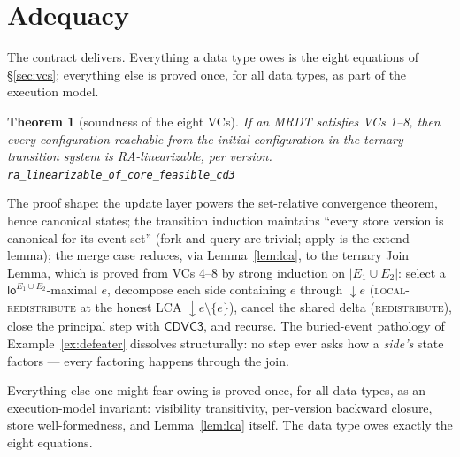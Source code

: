 \documentclass[11pt]{article}
\newtheorem{theorem}{Theorem}[section]
\newcommand{\loE}[1]{\mathsf{lo}^{#1}}
\newcommand{\dow}[1]{{\downarrow}#1}
\newcommand{\cd}{\mathsf{CDVC3}}
\newcommand{\lean}[1]{\texttt{#1}}
\begin{document}
\section{Adequacy}
\label{sec:adequacy}

The contract delivers. Everything a data type owes is the eight
equations of \S\ref{sec:vcs}; everything else is proved once, for all
data types, as part of the execution model.

\begin{theorem}[soundness of the eight VCs]
\label{thm:main}
If an MRDT satisfies VCs 1--8, then every configuration reachable from
the initial configuration in the ternary transition system is
RA-linearizable, per version.
\hfill\lean{ra\_linearizable\_of\_core\_feasible\_cd3}
\end{theorem}

The proof shape: the update layer powers the set-relative convergence
theorem, hence canonical states; the transition induction maintains
``every store version is canonical for its event set'' (fork and query
are trivial; apply is the extend lemma); the merge case reduces, via
Lemma~\ref{lem:lca}, to the ternary Join Lemma, which is proved from VCs
4--8 by strong induction on $|E_1 \cup E_2|$: select a
$\loE{E_1\cup E_2}$-maximal $e$, decompose each side containing $e$
through $\dow{e}$ (\textsc{local-redistribute} at the honest LCA
$\dow{e}\setminus\{e\}$), cancel the shared delta
(\textsc{redistribute}), close the principal step with $\cd$, and recurse.
The buried-event pathology of Example~\ref{ex:defeater} dissolves
structurally: no step ever asks how a \emph{side's} state factors ---
every factoring happens through the join.

Everything else one might fear owing is proved once, for all data types,
as an execution-model invariant: visibility transitivity, per-version
backward closure, store well-formedness, and Lemma~\ref{lem:lca} itself.
The data type owes exactly the eight equations.
\end{document}
